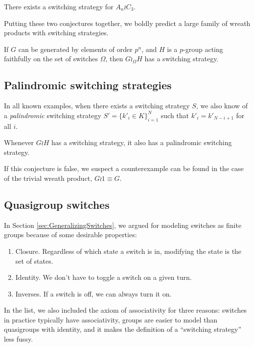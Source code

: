 \begin{conjecture}
  There exists a switching strategy for $A_n \wr C_3$.
\end{conjecture}

Putting these two conjectures together, we boldly predict a large family
of wreath products with switching strategies.
\begin{conjecture}
  If $G$ can be generated by elements of order $p^n$, and $H$ is a $p$-group
  acting faithfully on the set of switches $\Omega$, then $G \wr_\Omega H$ has
  a switching strategy.
\end{conjecture}

\subsection{Palindromic switching strategies}
In all known examples, when there exists a switching strategy $S$,
we also know of a \textit{palindromic} switching strategy
$S' = \{k'_i \in K\}_{i=1}^N$
such that $k'_i = k'_{N-i+1}$ for all $i$.

\begin{conjecture}
  Whenever $G \wr H$ has a switching strategy, it also has a palindromic switching
  strategy.
\end{conjecture}

If this conjecture is false, we suspect a counterexample can be found in the
case of the trivial wreath product, $G \wr \mathrm{1} \equiv G$.

\subsection{Quasigroup switches}
\label{sub:quasigroupSwitches}
In Section \ref{sec:GeneralizingSwitches}, we argued for modeling switches as
finite groups because of some desirable properties: \begin{enumerate}
  \item Closure. Regardless of which state a switch is in, modifying the state is the set of states.
  \item Identity. We don't have to toggle a switch on a given turn.
  \item Inverses. If a switch is off, we can always turn it on.
\end{enumerate}

In the list, we also included the axiom of associativity for three reasons:
switches in practice typically have associativity,
groups are easier to model than quasigroups with identity, and
it makes the definition of a ``switching strategy'' less fussy.

